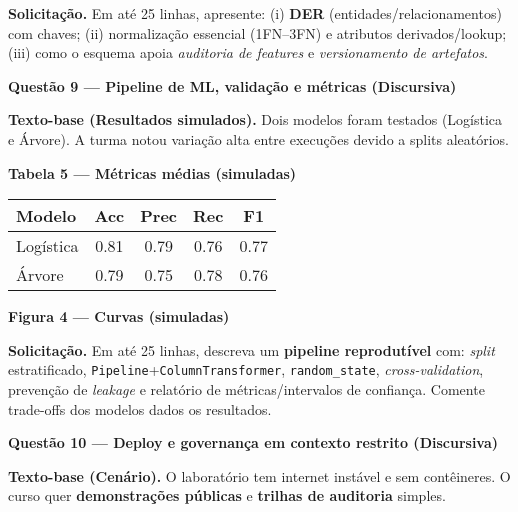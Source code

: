 \documentclass[12pt,a4paper]{article}
\begin{document}
\noindent\textbf{Solicitação.} Em até 25 linhas, apresente: (i) \textbf{DER} (entidades/relacionamentos) com chaves; (ii) normalização essencial (1FN–3FN) e atributos derivados/lookup; (iii) como o esquema apoia \textit{auditoria de features} e \textit{versionamento de artefatos}.

\newpage
\noindent\textbf{Questão 9 — Pipeline de ML, validação e métricas (Discursiva)}
\par\noindent\textbf{Texto-base (Resultados simulados).} Dois modelos foram testados (Logística e Árvore). A turma notou variação alta entre execuções devido a splits aleatórios.

\noindent\textbf{Tabela 5 — Métricas médias (simuladas)}
\begin{center}
\begin{tabular}{lcccc}
\toprule
\textbf{Modelo} & \textbf{Acc} & \textbf{Prec} & \textbf{Rec} & \textbf{F1}\\
\midrule
Logística & 0.81 & 0.79 & 0.76 & 0.77\\
Árvore & 0.79 & 0.75 & 0.78 & 0.76\\
\bottomrule
\end{tabular}
\end{center}

\noindent\textbf{Figura 4 — Curvas (simuladas)}
\begin{center}
\end{center}

\noindent\textbf{Solicitação.} Em até 25 linhas, descreva um \textbf{pipeline reprodutível} com: \textit{split} estratificado, \texttt{Pipeline}+\texttt{ColumnTransformer}, \texttt{random\_state}, \textit{cross-validation}, prevenção de \emph{leakage} e relatório de métricas/intervalos de confiança. Comente trade-offs dos modelos dados os resultados.

\newpage
\noindent\textbf{Questão 10 — Deploy e governança em contexto restrito (Discursiva)}
\par\noindent\textbf{Texto-base (Cenário).} O laboratório tem internet instável e sem contêineres. O curso quer \textbf{demonstrações públicas} e \textbf{trilhas de auditoria} simples.
\end{document}
